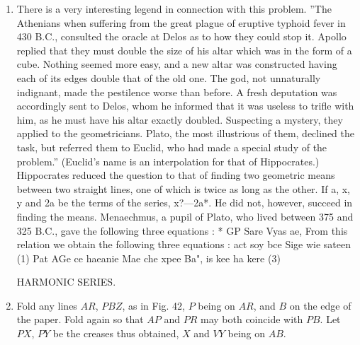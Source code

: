 \begin{enumerate}
\item There is a very interesting legend in connection with this problem. ''The
    Athenians when suffering from the great plague of eruptive typhoid fever in
    430 B.C., consulted the oracle at Delos as to how they could stop it.
    Apollo replied that they must double the size of his altar which was in the
    form of a cube.  Nothing seemed more easy, and a new altar was constructed
    having each of its edges double that of the old one.  The god, not
    unnaturally indignant, made the pestilence worse than before.  A fresh
    deputation was accordingly sent to Delos, whom he informed that it was
    useless to trifle with him, as he must have his altar exactly doubled.
    Suspecting a mystery, they applied to the geometricians.  Plato, the most
    illustrious of them, declined the task, but referred them to Euclid, who had
    made a special study of the problem.'' (Euclid's name is an interpolation
    for that of Hippocrates.)  Hippocrates reduced the question to that of
    finding two geometric means between two straight lines, one of which is
    twice as long as the other.  If a, x, y and 2a be the terms of the series,
    x?—2a*.  He did not, however, succeed in finding the means.  Menaechmus, a
    pupil of Plato, who lived between 375 and 325 B.C., gave the following three
    equations : * GP Sare Vyas ae, From this relation we obtain the following
    three equations : act soy bce Sige wie sateen (1) Pat AGe ce haeanie Mae che
    xpee Ba", is kee ha kere (3)



%
%
%
%
%
%


HARMONIC SERIES.


\item Fold any lines $AR$, $PBZ$, as in Fig. 42, $P$ being on $AR$, and $B$ on
    the edge of the paper. Fold again so that $AP$ and $PR$ may both coincide
    with $PB$.  Let $PX$, $PY$ be the creases thus obtained, $X$ and $VY$ being
    on $AB$.


\end{enumerate}
